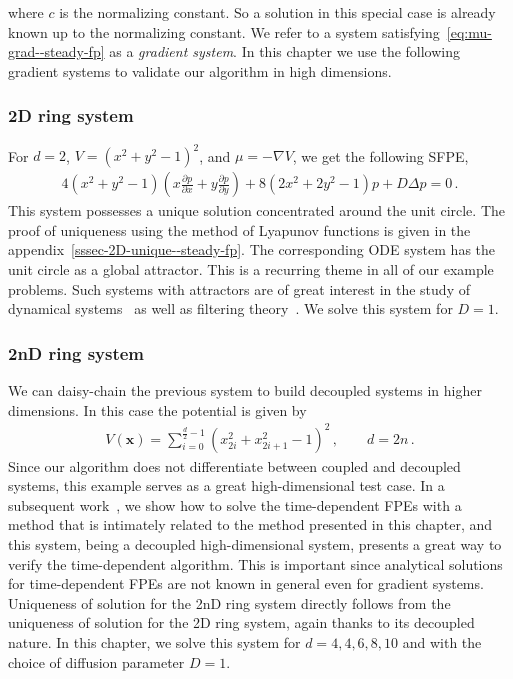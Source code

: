 where $c$ is the normalizing constant. So a solution in this special case is already known up to the normalizing constant. We refer to a system satisfying~\eqref{eq:mu-grad--steady-fp} as a \textit{gradient system}.
In this chapter we use the following gradient systems to validate our algorithm in high dimensions. 

\subsubsection{2D ring system}
For $d=2$, $V=(x^2+y^2-1)^2$, and $\mu=-\nabla V$, we get the following SFPE,
\begin{align}
     4(x^2+y^2-1)\left(x\frac{\partial p}{\partial x}+y\frac{\partial p}{\partial y}\right) + 8(2x^2+2y^2-1)p + D\Delta p=0 \,. \label{eq:ring2D--steady-fp}
\end{align}
This system possesses a unique solution concentrated around the unit circle. The proof of uniqueness using the method of Lyapunov functions is given in the appendix~\ref{sssec-2D-unique--steady-fp}. The corresponding ODE system has the unit circle as a global attractor. This is a recurring theme in all of our example problems. Such systems with attractors are of great interest in the study of dynamical systems~\cite{ott1981strange} as well as filtering theory~\cite{kontorovich2009non}. We solve this system for $D=1$.

\subsubsection{2nD ring system} We can daisy-chain the previous system to build decoupled systems in higher dimensions. In this case the potential is given by
\begin{align}
    V(\mathbf x)=\sum_{i=0}^{\frac{d}{2}-1}(x_{2i}^2+x_{2i+1}^2-1)^2 \,,\qquad d=2n \,.
\end{align}
Since our algorithm does not differentiate between coupled and decoupled systems, this example serves as a great high-dimensional test case. In a subsequent work~\cite{dynamicfp2024}, we show how to solve the time-dependent FPEs with a method that is intimately related to the method presented in this chapter, and this system, being a decoupled high-dimensional system, presents a great way to verify the time-dependent algorithm. This is important since analytical solutions for time-dependent FPEs are not known in general even for gradient systems. Uniqueness of solution for the 2nD ring system directly follows from the uniqueness of solution for the 2D ring system, again thanks to its decoupled nature. In this chapter, we solve this system for $d = 4, 4, 6, 8, 10$ and with the choice of diffusion parameter $D=1$.

